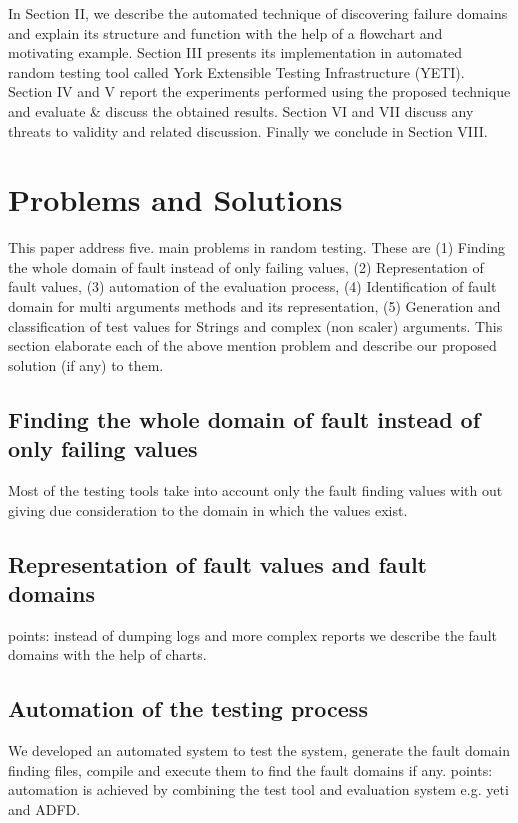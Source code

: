 \documentclass{acm_proc_article-sp}
\begin{document}
In Section II, we describe the automated technique of  discovering failure domains and explain its structure and function with the help of a flowchart and motivating example. Section III presents its implementation in automated random testing tool called York Extensible Testing Infrastructure (YETI). Section IV and V report the experiments performed using the proposed technique and evaluate \& discuss the obtained results. Section VI and VII discuss any threats to validity and related discussion. Finally we conclude in Section VIII. 


\section{Problems and Solutions}\label{sec:probl_and_sol}
This paper address five. main problems in random testing. These are (1) Finding the whole domain of fault instead of only failing values, (2) Representation of fault values, (3) automation of the evaluation process, (4) Identification of fault domain for multi arguments methods and its representation, (5) Generation and classification of test values for Strings and complex (non scaler) arguments. This section elaborate each of the above mention problem and describe our proposed solution (if any) to them.

\subsection{Finding the whole domain of fault instead of only failing values}
Most of the testing tools take into account only the fault finding values with out giving due consideration to the domain in which the values exist. \subsection{Representation of fault values and fault domains}
points: instead of dumping logs and more complex reports we describe the fault domains with the help of charts. 
\subsection{Automation of the testing process}
We developed an automated system to test the system, generate the fault domain finding files, compile and execute them to find the fault domains if any. points: automation is achieved by combining the test tool and evaluation system e.g. yeti and ADFD.   
\end{document}

